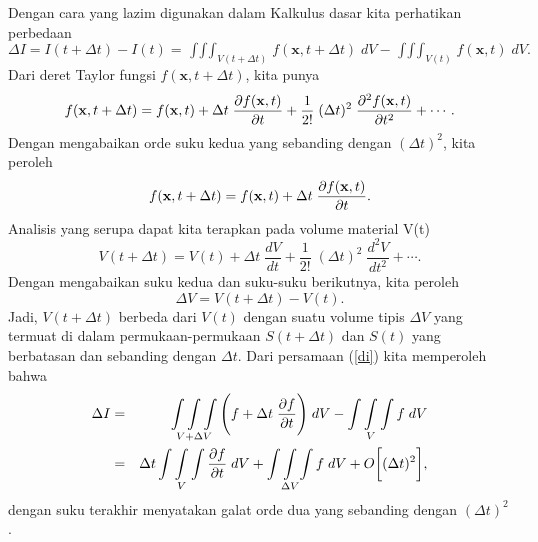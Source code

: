 \documentclass[12pt,a4paper]{report}
\begin{document}
Dengan cara yang lazim digunakan dalam Kalkulus dasar kita perhatikan
perbedaan
\begin{equation}
\Delta I = I(t+\Delta t)-I(t) = \mathop{\int\int\int}_{V(t+\Delta t)} f(%
\mathbf{x},t+\Delta t)\;dV - \mathop{\int\int\int}_{V(t)}f(\mathbf{x},t)\;dV.
\label{di}
\end{equation}
Dari deret Taylor fungsi $f(\mathbf{x},t+ \Delta t)$, kita punya
\begin{equation}
f(\mathbf{x},t+\Delta t)=f(\mathbf{x},t)+\Delta t \;\frac{\partial f(\mathbf{%
x},t)}{\partial t}+\frac{1}{2!}\; (\Delta t)^2\; \frac{\partial ^2 f(\mathbf{%
x},t)}{\partial t^2}+ \cdots .
\end{equation}
Dengan mengabaikan orde suku kedua yang sebanding dengan $(\Delta t)^2$,
kita peroleh
\begin{equation}
f(\mathbf{x},t+\Delta t)=f(\mathbf{x},t)+\Delta t \;\frac{\partial f(\mathbf{%
x},t)}{\partial t}.
\end{equation}
Analisis yang serupa dapat kita terapkan pada volume material V(t)
\begin{equation}
V(t+\Delta t)=V(t)+ \Delta t \;\frac{dV}{dt}+\frac{1}{2!}\;(\Delta t)^2\;
\frac{d^2V}{dt^2} + \cdots .
\end{equation}
Dengan mengabaikan suku kedua dan suku-suku berikutnya, kita peroleh
\begin{equation}
\Delta V = V(t+\Delta t)-V(t).
\end{equation}
Jadi, $V(t+\Delta t)$ berbeda dari $V(t)$ dengan suatu volume tipis $\Delta
V $ yang termuat di dalam permukaan-permukaan $S(t+\Delta t)$ dan $S(t)$
yang berbatasan dan sebanding dengan $\Delta t.$ Dari persamaan (\ref{di})
kita memperoleh bahwa
\begin{eqnarray}
\Delta I &=& \mathop{\int\int\int}_{V+\Delta V}\Bigg(f+\Delta t\; \frac{%
\partial f}{\partial t}\Bigg)\;dV - \mathop{\int\int\int}_{V}f\; dV \\
&=&\Delta t\mathop{\int\int\int}_{V} \frac{\partial f}{\partial t}\;dV + %
\mathop{\int\int\int}_{\Delta V}f \;dV + O \bigg[(\Delta t)^2\bigg],
\end{eqnarray}
dengan suku terakhir menyatakan galat orde dua yang sebanding dengan $%
(\Delta t)^2$.
\end{document}
